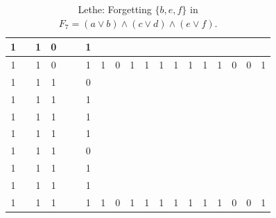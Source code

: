 \begin{table}[!tb]
\begin{tabular}{|c|c|c|c|c|c|c|c|c|c|c|c|c|c|c|c|c|c|c|}
        \rowcolor{blue!40} 1 &  & 1 & 0 &  &  & 1 &  &  &  &  &  &  &  &  &  &  &  &  \\ \hline
        \rowcolor{blue!40} 1 &  & 1 & 0 &  &  & 1 & 1 & 0 & 1 & 1 & 1 & 1 & 1 & 1 & 1 & 0 & 0 & 1 \\ \hline
        \rowcolor{red!40} 1 &  & 1 & 1 &  &  & 0 &  &  &  &  &  &  &  &  &  &  &  &  \\ \hline
        \rowcolor{red!40} 1 &  & 1 & 1 &  &  & 1 &  &  &  &  &  &  &  &  &  &  &  &  \\ \hline
        \rowcolor{red!40} 1 &  & 1 & 1 &  &  & 1 &  &  &  &  &  &  &  &  &  &  &  &  \\ \hline
        \rowcolor{red!40} 1 &  & 1 & 1 &  &  & 1 &  &  &  &  &  &  &  &  &  &  &  &  \\ \hline
        \rowcolor{red!40} 1 &  & 1 & 1 &  &  & 0 &  &  &  &  &  &  &  &  &  &  &  &  \\ \hline
        \rowcolor{red!40} 1 &  & 1 & 1 &  &  & 1 &  &  &  &  &  &  &  &  &  &  &  &  \\ \hline
        \rowcolor{red!40} 1 &  & 1 & 1 &  &  & 1 &  &  &  &  &  &  &  &  &  &  &  &  \\ \hline
        \rowcolor{red!40} 1 &  & 1 & 1 &  &  & 1 & 1 & 0 & 1 & 1 & 1 & 1 & 1 & 1 & 1 & 0 & 0 & 1 \\ \hline
    \end{tabular}
    \caption{Lethe: Forgetting $\{b, e, f\}$ in $F_{7} = (a \lor b) \land (c \lor d) \land (e \lor f)$.}
    \label{tab:lethe-F7-bef}
\end{table}
